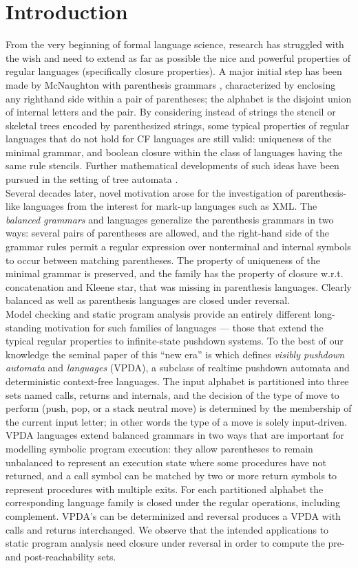 \documentclass[3p,11pt]{elsarticle}
\begin{document}
\section{Introduction}
From the very beginning of formal language science, research has struggled with the wish and need to extend as far as possible the nice and powerful properties of regular languages (specifically closure properties). A major initial step has been made by McNaughton with parenthesis grammars \cite{McNaughton67}, characterized by enclosing any righthand side within a pair of parentheses; the alphabet is the disjoint union of internal letters and the pair. By considering instead of strings the stencil or skeletal trees encoded by parenthesized strings, some typical properties of regular languages that do not hold for CF languages are still valid: uniqueness of the minimal grammar, and boolean closure within the class of languages having the same rule stencils. Further mathematical developments of such ideas have been pursued in the setting of tree automata \cite{Tha67}.
\\
Several decades later, novel motivation arose for the investigation of parenthesis-like languages from the interest for mark-up languages such as XML. The \emph{balanced grammars} and languages \cite{Berstel:2001:BGT} generalize the parenthesis grammars in two ways: several pairs of parentheses are allowed, and the right-hand side of the grammar rules permit a regular expression over nonterminal and internal symbols to occur between matching parentheses. The property of uniqueness of the minimal grammar is preserved, and the family has the property of closure w.r.t. concatenation and Kleene star, that was missing in parenthesis languages. Clearly balanced as well as parenthesis languages are closed under reversal.
\\
Model checking and static program analysis provide an entirely different long-standing motivation for such families of languages --- those that extend the typical regular properties to infinite-state pushdown systems. To the best of our knowledge the seminal paper of this ``new era'' is \cite{AluMad04} which defines \emph{visibly pushdown automata} and \emph{languages} (VPDA), a subclass of realtime pushdown automata  and deterministic context-free languages. The input alphabet is partitioned into three sets named calls, returns and internals, and the decision of the type of move to perform (push, pop, or a stack neutral move) is determined by the membership of the current input letter; in other words the type of a move is solely input-driven. VPDA languages extend balanced grammars in two ways that are important for modelling symbolic program execution: they allow parentheses to remain unbalanced to represent an execution state where some procedures have not returned, and a call symbol can be matched by two or more return symbols to represent procedures with multiple exits. For each partitioned alphabet the corresponding language family is closed under the regular operations, including complement. VPDA's can be determinized and reversal produces a VPDA with calls and returns interchanged. We observe that the intended applications to static program analysis need closure under reversal in order to compute the pre- and post-reachability sets.
\end{document}
